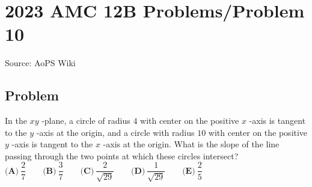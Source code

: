 \documentclass[12pt]{article}
\begin{document}
\section*{{2023 AMC 12B Problems/Problem 10}}
Source: AoPS Wiki

\subsection*{Problem}
In the $xy$ -plane, a circle of radius $4$ with center on the positive $x$ -axis is tangent to the $y$ -axis at the origin, and a circle with radius $10$ with center on the positive $y$ -axis is tangent to the $x$ -axis at the origin. What is the slope of the line passing through the two points at which these circles intersect? $\textbf{(A)}\ \dfrac{2}{7} \qquad\textbf{(B)}\ \dfrac{3}{7} \qquad\textbf{(C)}\ \dfrac{2}{\sqrt{29}} \qquad\textbf{(D)}\ \dfrac{1}{\sqrt{29}} \qquad\textbf{(E)}\ \dfrac{2}{5}$
\end{document}
